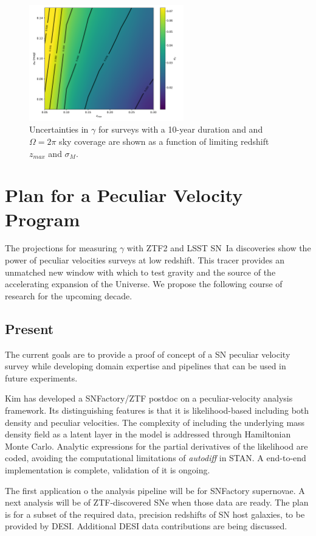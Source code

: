 \documentclass[11pt, oneside]{article}   	%
\begin{document}
\begin{figure}
\centering
\includegraphics[width=0.6\textwidth]{src/surface2.pdf}
\caption{Uncertainties in $\gamma$ for surveys with a 10-year duration and  and $\Omega=2\pi$ sky coverage 
are shown as a function of limiting  redshift $z_{max}$ and $\sigma_M$.
\label{lsst:fig}}
\end{figure}


\section{Plan for a Peculiar Velocity Program}
The projections for measuring $\gamma$ with ZTF2 and LSST SN~Ia discoveries
show the power of peculiar velocities surveys at low redshift.
This  tracer provides an unmatched  new window with which to test gravity and the source of the accelerating expansion of the Universe.
We propose the following course of research for the upcoming decade.

\subsection{Present}
The current goals are to provide a proof of concept of a SN peculiar velocity survey while developing domain
expertise and pipelines that can be used in future experiments.

Kim has developed a SNFactory/ZTF postdoc on a peculiar-velocity analysis framework.  Its distinguishing features is that it is likelihood-based
including both density and peculiar velocities.  The complexity of including the underlying mass density field as a latent layer in the model
is addressed through Hamiltonian Monte Carlo.  Analytic expressions for the partial derivatives of the likelihood are coded,
avoiding the computational limitations of {\it autodiff} in STAN.  A end-to-end implementation is complete, validation of it is ongoing.

The first application o the analysis pipeline will be for SNFactory supernovae.  A next analysis will be of ZTF-discovered 
SNe when those data are ready.  The plan is for a  subset of the required data, precision redshifts of SN host galaxies, to be provided
by DESI.  Additional DESI data contributions are being discussed.
\end{document}
